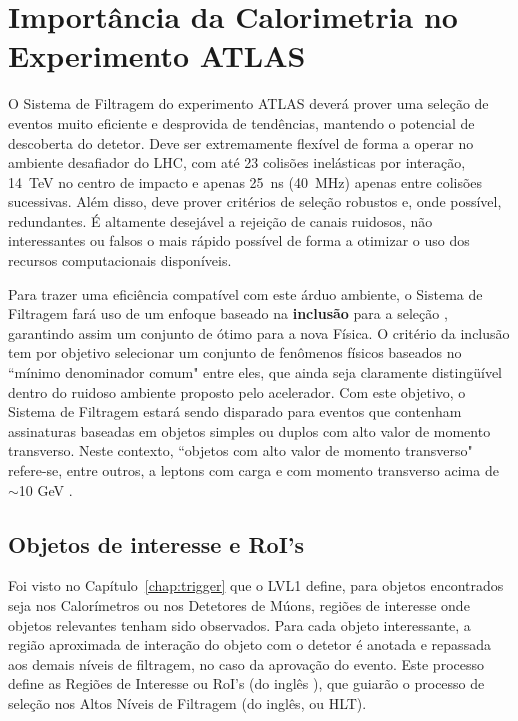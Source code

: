

\section{Importância da Calorimetria no Experimento ATLAS}

O Sistema de Filtragem  do experimento ATLAS deverá prover uma
seleção de eventos muito eficiente e desprovida de tendências, mantendo o
potencial de descoberta do detetor. Deve ser extremamente flexível de forma a
operar no ambiente desafiador do LHC, com até 23 colisões inelásticas por
interação, 14~TeV no centro de impacto e apenas 25~ns (40~MHz) apenas entre
colisões sucessivas. Além disso, deve prover critérios de seleção robustos e,
onde possível, redundantes. É altamente desejável a rejeição de canais
ruidosos, não interessantes ou falsos o mais rápido possível de forma a
otimizar o uso dos recursos computacionais disponíveis.

Para trazer uma eficiência compatível com este árduo ambiente, o Sistema de
Filtragem fará uso de um enfoque baseado na \textbf{inclusão} para a seleção
, garantindo assim um conjunto de
 ótimo para a nova Física. O critério da inclusão tem por
objetivo selecionar um conjunto de fenômenos físicos baseados no ``mínimo
denominador comum" entre eles, que ainda seja claramente distingüível dentro
do ruidoso ambiente proposto pelo acelerador. Com este objetivo, o Sistema de
Filtragem estará sendo disparado para eventos que contenham assinaturas
baseadas em objetos simples ou duplos com alto valor de momento
transverso. Neste contexto, ``objetos com alto valor de momento transverso"
refere-se, entre outros, a leptons com carga e com momento transverso acima de
$\sim$10 GeV \cite{hlt-tdr}.

\subsection{Objetos de interesse e RoI's}

Foi visto no Capítulo~\ref{chap:trigger} que o LVL1 define, para objetos
encontrados seja nos Calorímetros ou nos Detetores de Múons, regiões de
interesse onde objetos relevantes tenham sido observados. Para cada objeto
interessante, a região aproximada de interação do objeto com o detetor é
anotada e repassada aos demais níveis de filtragem, no caso da aprovação do
evento. Este processo define as Regiões de Interesse ou RoI's (do inglês
), que guiarão o processo de seleção nos Altos Níveis
de Filtragem (do inglês,  ou HLT).

